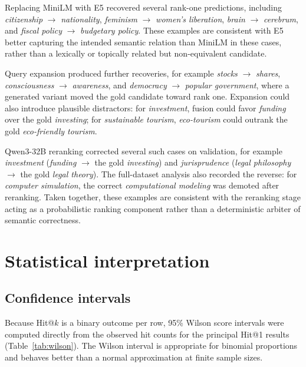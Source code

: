 Replacing MiniLM with E5 recovered several rank-one predictions, including \emph{citizenship} $\rightarrow$ \emph{nationality}, \emph{feminism} $\rightarrow$ \emph{women's liberation}, \emph{brain} $\rightarrow$ \emph{cerebrum}, and \emph{fiscal policy} $\rightarrow$ \emph{budgetary policy}. These examples are consistent with E5 better capturing the intended semantic relation than MiniLM in these cases, rather than a lexically or topically related but non-equivalent candidate.

Query expansion produced further recoveries, for example \emph{stocks} $\rightarrow$ \emph{shares}, \emph{consciousness} $\rightarrow$ \emph{awareness}, and \emph{democracy} $\rightarrow$ \emph{popular government}, where a generated variant moved the gold candidate toward rank one. Expansion could also introduce plausible distractors: for \emph{investment}, fusion could favor \emph{funding} over the gold \emph{investing}; for \emph{sustainable tourism}, \emph{eco-tourism} could outrank the gold \emph{eco-friendly tourism}.

Qwen3-32B reranking corrected several such cases on validation, for example \emph{investment} (\emph{funding} $\to$ the gold \emph{investing}) and \emph{jurisprudence} (\emph{legal philosophy} $\to$ the gold \emph{legal theory}). The full-dataset analysis also recorded the reverse: for \emph{computer simulation}, the correct \emph{computational modeling} was demoted after reranking. Taken together, these examples are consistent with the reranking stage acting as a probabilistic ranking component rather than a deterministic arbiter of semantic correctness.

\section{Statistical interpretation}

\subsection{Confidence intervals}

Because Hit@$k$ is a binary outcome per row, 95\% Wilson score intervals were computed directly from the observed hit counts for the principal Hit@1 results (Table~\ref{tab:wilson}). The Wilson interval is appropriate for binomial proportions and behaves better than a normal approximation at finite sample sizes.

